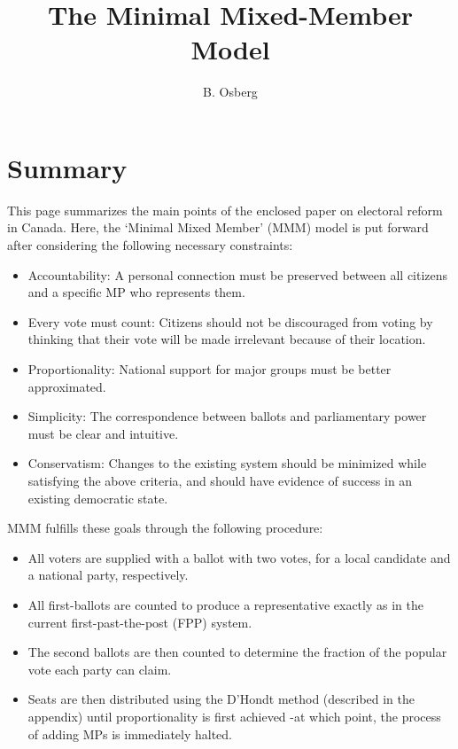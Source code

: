 \documentclass[DIV=calc, paper=a4, fontsize=11pt, twocolumn]{scrartcl}	 %
\title{The Minimal Mixed-Member Model} %
\author{B. Osberg} %
\date{} %
\begin{document}
\thispagestyle{fancy} %

\section*{Summary}
This page summarizes the main points of the enclosed paper on electoral reform in Canada. Here, the `Minimal Mixed Member' (MMM) model is put forward after considering the following necessary constraints:

\begin{itemize}
\item Accountability: A personal connection must be preserved between all citizens and a specific MP who represents them.  
\item Every vote must count: Citizens should not be discouraged from voting by thinking that their vote will be made irrelevant because of their location. 
\item Proportionality: National support for major groups must be better approximated. 
\item  Simplicity: The correspondence between ballots and parliamentary power must be clear and intuitive.
\item  Conservatism: Changes to the existing system should be minimized while satisfying the above criteria, and should have evidence of success in an existing democratic state.
\end{itemize}

MMM fulfills these goals through the following procedure:

\begin{itemize}
\item All voters are supplied with a ballot with two votes, for a local candidate and a national party, respectively.
\item All first-ballots are counted to produce a representative exactly as in the current first-past-the-post (FPP) system.
\item The second ballots are then counted to determine the fraction of the popular vote each party can claim.
\item Seats are then distributed using the D'Hondt method (described in the appendix) until proportionality is first achieved \--at which point, the process of adding MPs is immediately halted.
\end{itemize}
\end{document}
